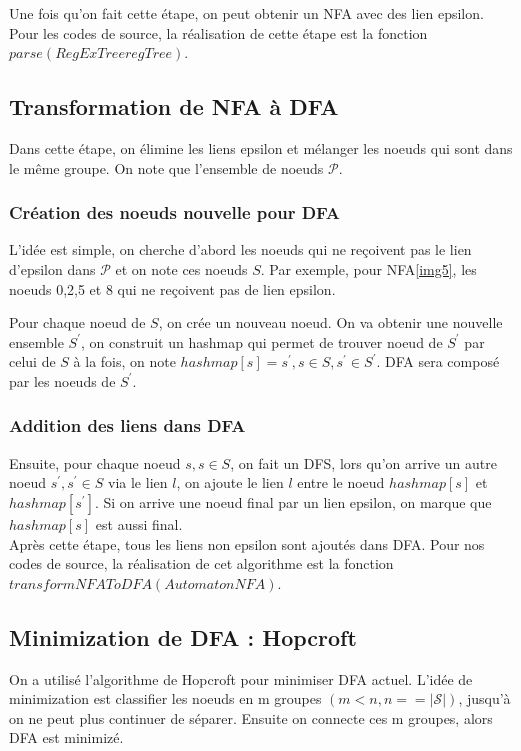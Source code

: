 \documentclass[14px]{article}
\begin{document}
Une fois qu'on fait cette étape, on peut obtenir un NFA avec des lien epsilon. Pour les codes de source, la réalisation de cette étape est la fonction $parse(RegExTree regTree)$.

\subsection{Transformation de NFA à DFA}
Dans cette étape, on élimine les liens epsilon et mélanger les noeuds qui sont dans le même groupe. On note que l'ensemble de noeuds $\mathcal{P}$.
\subsubsection{Création des noeuds nouvelle pour DFA}
L'idée est simple, on cherche d'abord les noeuds qui ne reçoivent pas le lien d'epsilon dans $\mathcal{P}$ et on note ces noeuds $S$. Par exemple, pour NFA\ref{img5}, les noeuds 0,2,5 et 8 qui ne reçoivent pas de lien epsilon.

Pour chaque noeud de $S$, on crée un nouveau noeud. On va obtenir une nouvelle ensemble $S^{\prime}$, on construit un hashmap qui permet de trouver noeud de $S^{\prime}$ par celui de $S$ à la fois, on note $hashmap[s] = s^{\prime}, s \in S, s^{\prime} \in S^{\prime}$. DFA sera composé par les noeuds de $S^{\prime}$.

\subsubsection{Addition des liens dans DFA}
Ensuite, pour chaque noeud $s, s \in S$, on fait un DFS, lors qu'on arrive un autre noeud $s^{\prime}, s^{\prime} \in S$ via le lien $l$, on ajoute le lien $l$ entre le noeud $hashmap[s]$ et $hashmap[s^{\prime}]$. Si on arrive une noeud final par un lien epsilon, on marque que $hashmap[s]$ est aussi final.\\

Après cette étape, tous les liens non epsilon sont ajoutés dans DFA. Pour nos codes de source, la réalisation de cet algorithme est la fonction $transformNFAToDFA(Automaton NFA)$.

\subsection{Minimization de DFA : Hopcroft}
On a utilisé l'algorithme de Hopcroft pour minimiser DFA actuel. L'idée de minimization est classifier les noeuds en m groupes $(m < n, n == |\mathcal{S}|)$, jusqu'à on ne peut plus continuer de séparer. Ensuite on connecte ces m groupes, alors DFA est minimizé.
\end{document}
